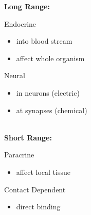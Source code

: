 \textbf{Long Range:}\\
\begin{minipage}{0.5\linewidth}
    Endocrine
    \begin{itemize}
        \item into blood stream
        \item affect whole organism
    \end{itemize}
\end{minipage}
\begin{minipage}{0.5\linewidth}
    Neural
    \begin{itemize}
        \item in neurons (electric)
        \item at synapses (chemical)
    \end{itemize}
\end{minipage}
\\
\textbf{Short Range:}\\
\begin{minipage}{0.5\linewidth}
    Paracrine
    \begin{itemize}
        \item affect local tissue
    \end{itemize}
\end{minipage}
\begin{minipage}{0.5\linewidth}
    Contact Dependent
    \begin{itemize}
        \item direct binding 
    \end{itemize}
\end{minipage}